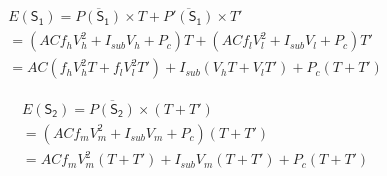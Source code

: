 \documentclass[12pt]{elsarticle}
\begin{document}
\vspace{-3mm}
\begin{align}
\label{node_energy_strategy1}
&E(\mathsf{S_1}) = \overline{P(\mathsf{S_1})} \times T + \overline{P'(\mathsf{S_1})} \times T'\nonumber\\
&= (ACf_hV_h^2 + I_{sub}V_h + P_c) T + (ACf_lV_l^2 + I_{sub}V_l + P_c) T'\nonumber\\
&= AC (f_hV_h^2T + f_lV_l^2T') + I_{sub}(V_hT + V_lT') + P_c (T + T')
\end{align}


\vspace{-5mm}
\begin{align}
\label{node_energy_strategy2}
&E(\mathsf{S_2}) = \overline{P(\mathsf{S_2})} \times (T + T')\nonumber\\&= (ACf_mV_m^2 + I_{sub}V_m + P_c) (T + T')\nonumber\\
&= ACf_mV_m^2 (T + T') + I_{sub}V_m (T + T') + P_c (T + T')
\end{align}
\end{document}
